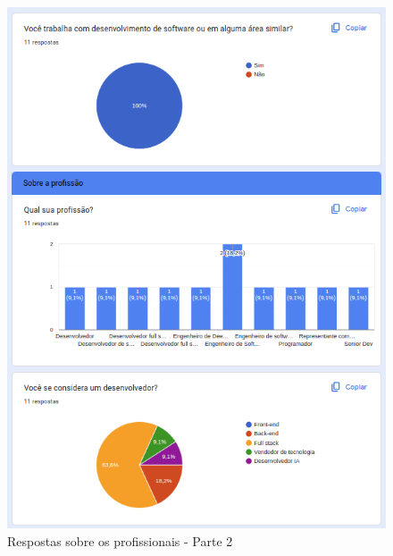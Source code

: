\newpage

\begin{figure}[!h]
	\begin{center}
	    \includegraphics[scale=0.7]{figs/Answers/Professionals/02.png}
	\end{center}
	\caption{\label{APC_02}Respostas sobre os profissionais - Parte 2}
\end{figure}

\newpage

